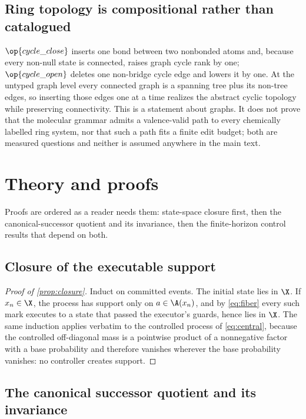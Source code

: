 \subsection{Ring topology is compositional rather than catalogued}

$\op{cycle\_close}$ inserts one bond between two nonbonded atoms and, because every non-null state is connected, raises graph cycle rank by one; $\op{cycle\_open}$ deletes one non-bridge cycle edge and lowers it by one.
At the untyped graph level every connected graph is a spanning tree plus its non-tree edges, so inserting those edges one at a time realizes the abstract cyclic topology while preserving connectivity.
This is a statement about graphs.
It does not prove that the molecular grammar admits a valence-valid path to every chemically labelled ring system, nor that such a path fits a finite edit budget; both are measured questions and neither is assumed anywhere in the main text.

\section{Theory and proofs}
\label{app:theory}

Proofs are ordered as a reader needs them: state-space closure first, then the canonical-successor quotient and its invariance, then the finite-horizon control results that depend on both.

\subsection{Closure of the executable support}
\label{app:proofs}

\begin{proof}[Proof of \cref{prop:closure}]
Induct on committed events. The initial state lies in $\X$. If $x_n\in\X$, the process has support only on $a\in\A(x_n)$, and by \eqref{eq:fiber} every such mark executes to a state that passed the executor's guards, hence lies in $\X$. The same induction applies verbatim to the controlled process of \eqref{eq:central}, because the controlled off-diagonal mass is a pointwise product of a nonnegative factor with a base probability and therefore vanishes wherever the base probability vanishes: no controller creates support.
\end{proof}


\subsection{The canonical successor quotient and its invariance}
\label{app:quotient}

